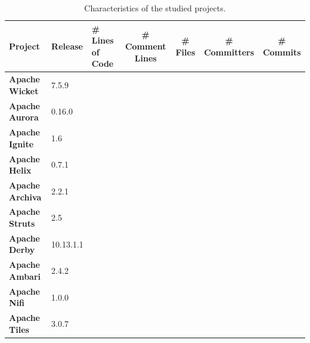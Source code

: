 \begin{landscape}

	
	
	\begin{table}[htbp]
		\small
		\centering
		\caption{Characteristics of the studied projects.}
		\begin{adjustbox}{width=1.3\textwidth}
			
			
			\begin{tabular}{l|l|l|c|c|c|c}
				\hline
				\textbf{Project}           & \textbf{Release} & \textbf{\# Lines of Code} & \textbf{\# Comment Lines} & \textbf{\# Files} & \textbf{\# Committers} & \textbf{\# Commits} \\ \hline
				\textbf{Apache Wicket}     & 7.5.9            &                           &                           &                   &                        &  \\ \hline
				\textbf{Apache Aurora}     & 0.16.0           &                           &                           &                   &                        &  \\ \hline
				\textbf{Apache Ignite}     & 1.6              &                           &                           &                   &                        &  \\ \hline
				\textbf{Apache Helix}      & 0.7.1            &                           &                           &                   &                        &  \\ \hline
				\textbf{Apache Archiva}    & 2.2.1            &                           &                           &                   &                        &  \\ \hline
				\textbf{Apache Struts}     & 2.5              &                           &                           &                   &                        &  \\ \hline
				\textbf{Apache Derby}      & 10.13.1.1        &                           &                           &                   &                        &  \\ \hline
				\textbf{Apache Ambari}     & ‎2.4.2           &                           &                           &                   &                        &  \\ \hline
				\textbf{Apache Nifi}       & 1.0.0            &                           &                           &                   &                        &  \\ \hline
				\textbf{Apache Tiles}      & 3.0.7            &                           &                           &                   &                        &  \\ \hline

\end{tabular}
\end{adjustbox}
\end{table}
\end{landscape}
